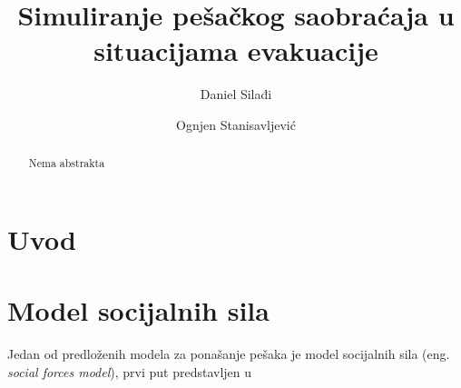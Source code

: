 \documentclass[12pt]{article}
\begin{document}
\title{\textbf{Simuliranje pešačkog saobraćaja u situacijama evakuacije}}

\author{
Daniel Silađi\\
\and
Ognjen Stanisavljević
}

\date{} %
\maketitle %


\begin{abstract}
Nema abstrakta
\end{abstract}


\section{Uvod}

\section{Model socijalnih sila}

Jedan od predloženih modela za ponašanje pešaka je model socijalnih sila (eng. \textit{social forces model}), prvi put predstavljen u 

\section{}

\begin{scriptsize}

\end{scriptsize}
\end{document}
